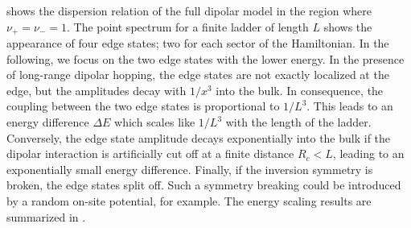  shows the dispersion relation of the full dipolar model in the region where $\nu_+ = \nu_- = 1$.
The point spectrum for a finite ladder of length $L$ shows the appearance of four edge states; two for each sector of the Hamiltonian.
In the following, we focus on the two edge states with the lower energy.
In the presence of long-range dipolar hopping, the edge states are not exactly localized at the edge, but the amplitudes decay with $1/x^3$ into the bulk.
In consequence, the coupling between the two edge states is proportional to $1/L^3$.
This leads to an energy difference $\Delta E$ which scales like $1/L^3$ with the length of the ladder.
Conversely, the edge state amplitude decays exponentially into the bulk if the dipolar interaction is artificially cut off at a finite distance $R_c < L$, leading to an exponentially small energy difference.
Finally, if the inversion symmetry is broken, the edge states split off.
Such a symmetry breaking could be introduced by a random on-site potential, for example.
The energy scaling results are summarized in .

